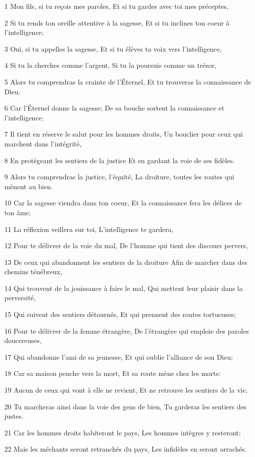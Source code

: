 \par 1 Mon fils, si tu reçois mes paroles, Et si tu gardes avec toi mes préceptes,
\par 2 Si tu rends ton oreille attentive à la sagesse, Et si tu inclines ton coeur à l'intelligence;
\par 3 Oui, si tu appelles la sagesse, Et si tu élèves ta voix vers l'intelligence,
\par 4 Si tu la cherches comme l'argent, Si tu la poursuis comme un trésor,
\par 5 Alors tu comprendras la crainte de l'Éternel, Et tu trouveras la connaissance de Dieu.
\par 6 Car l'Éternel donne la sagesse; De sa bouche sortent la connaissance et l'intelligence;
\par 7 Il tient en réserve le salut pour les hommes droits, Un bouclier pour ceux qui marchent dans l'intégrité,
\par 8 En protégeant les sentiers de la justice Et en gardant la voie de ses fidèles.
\par 9 Alors tu comprendras la justice, l'équité, La droiture, toutes les routes qui mènent au bien.
\par 10 Car la sagesse viendra dans ton coeur, Et la connaissance fera les délices de ton âme;
\par 11 La réflexion veillera sur toi, L'intelligence te gardera,
\par 12 Pour te délivrer de la voie du mal, De l'homme qui tient des discours pervers,
\par 13 De ceux qui abandonnent les sentiers de la droiture Afin de marcher dans des chemins ténébreux,
\par 14 Qui trouvent de la jouissance à faire le mal, Qui mettent leur plaisir dans la perversité,
\par 15 Qui suivent des sentiers détournés, Et qui prennent des routes tortueuses;
\par 16 Pour te délivrer de la femme étrangère, De l'étrangère qui emploie des paroles doucereuses,
\par 17 Qui abandonne l'ami de sa jeunesse, Et qui oublie l'alliance de son Dieu;
\par 18 Car sa maison penche vers la mort, Et sa route mène chez les morts:
\par 19 Aucun de ceux qui vont à elle ne revient, Et ne retrouve les sentiers de la vie.
\par 20 Tu marcheras ainsi dans la voie des gens de bien, Tu garderas les sentiers des justes.
\par 21 Car les hommes droits habiteront le pays, Les hommes intègres y resteront;
\par 22 Mais les méchants seront retranchés du pays, Les infidèles en seront arrachés.

